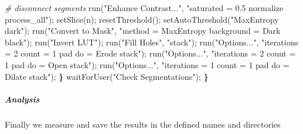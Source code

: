 \documentclass[10pt, b5paper, singlespacinge, twoside]{reedthesis} %
\newenvironment{Shaded}{}{}
\newcommand{\CommentTok}[1]{\textit{#1}}
\newcommand{\ErrorTok}[1]{\textbf{#1}}
\newcommand{\FunctionTok}[1]{#1}
\newcommand{\NormalTok}[1]{#1}
\newcommand{\StringTok}[1]{#1}
\theoremstyle{definition}
\theoremstyle{definition}
\theoremstyle{definition}
\theoremstyle{remark}
\begin{document}
\begin{Shaded}
\begin{Highlighting}[numbers=left,,]
    \CommentTok{\#   disconnect segments}
        \FunctionTok{run}\NormalTok{(}\StringTok{"Enhance Contrast..."}\NormalTok{,}
            \StringTok{"saturated = 0.5 normalize process\_all"}\NormalTok{);}
        \FunctionTok{setSlice}\NormalTok{(n);}
        \FunctionTok{resetThreshold}\NormalTok{();}
        \FunctionTok{setAutoThreshold}\NormalTok{(}\StringTok{"MaxEntropy dark"}\NormalTok{);}
        \FunctionTok{run}\NormalTok{(}\StringTok{"Convert to Mask"}\NormalTok{,}
            \StringTok{"method = MaxEntropy background = Dark black"}\NormalTok{);}
        \FunctionTok{run}\NormalTok{(}\StringTok{"Invert LUT"}\NormalTok{);}
        \FunctionTok{run}\NormalTok{(}\StringTok{"Fill Holes"}\NormalTok{, }\StringTok{"stack"}\NormalTok{);}
        \FunctionTok{run}\NormalTok{(}\StringTok{"Options..."}\NormalTok{, }
            \StringTok{"iterations = 2 count = 1 pad do = Erode stack"}\NormalTok{);}
        \FunctionTok{run}\NormalTok{(}\StringTok{"Options..."}\NormalTok{, }
            \StringTok{"iterations = 2 count = 1 pad do = Open stack"}\NormalTok{);}
        \FunctionTok{run}\NormalTok{(}\StringTok{"Options..."}\NormalTok{, }
            \StringTok{"iterations = 1 count = 1 pad do = Dilate stack"}\NormalTok{);}
    \ErrorTok{\}}
    \FunctionTok{waitForUser}\NormalTok{(}\StringTok{"Check Segmentations"}\NormalTok{);}
    \ErrorTok{\}}
\end{Highlighting}
\end{Shaded}
\normalsize

\hypertarget{analysis}{%
\subparagraph{Analysis}\label{analysis}}

Finally we measure and save the results in the defined names and directories
\end{document}
